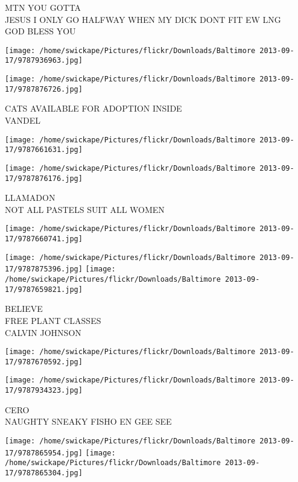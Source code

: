 \documentclass[10pt,letterpaper]{article}
\begin{document}
MTN YOU GOTTA\\
JESUS I ONLY GO HALFWAY WHEN MY DICK DONT FIT EW LNG\\
GOD BLESS YOU
\pagebreak

\texttt{[image: /home/swickape/Pictures/flickr/Downloads/Baltimore 2013-09-17/9787936963.jpg]}

\vspace{0.25in}
\texttt{[image: /home/swickape/Pictures/flickr/Downloads/Baltimore 2013-09-17/9787876726.jpg]}

CATS AVAILABLE FOR ADOPTION INSIDE\\
VANDEL
\pagebreak

\texttt{[image: /home/swickape/Pictures/flickr/Downloads/Baltimore 2013-09-17/9787661631.jpg]}

\vspace{0.25in}
\texttt{[image: /home/swickape/Pictures/flickr/Downloads/Baltimore 2013-09-17/9787876176.jpg]}

LLAMADON\\
NOT ALL PASTELS SUIT ALL WOMEN
\pagebreak

\texttt{[image: /home/swickape/Pictures/flickr/Downloads/Baltimore 2013-09-17/9787660741.jpg]}

\vspace{0.25in}
\texttt{[image: /home/swickape/Pictures/flickr/Downloads/Baltimore 2013-09-17/9787875396.jpg]}
\texttt{[image: /home/swickape/Pictures/flickr/Downloads/Baltimore 2013-09-17/9787659821.jpg]}

BELIEVE\\
FREE PLANT CLASSES\\
CALVIN JOHNSON
\pagebreak

\texttt{[image: /home/swickape/Pictures/flickr/Downloads/Baltimore 2013-09-17/9787670592.jpg]}

\vspace{0.25in}
\texttt{[image: /home/swickape/Pictures/flickr/Downloads/Baltimore 2013-09-17/9787934323.jpg]}

CERO\\
NAUGHTY SNEAKY FISHO EN GEE SEE
\pagebreak

\texttt{[image: /home/swickape/Pictures/flickr/Downloads/Baltimore 2013-09-17/9787865954.jpg]}
\texttt{[image: /home/swickape/Pictures/flickr/Downloads/Baltimore 2013-09-17/9787865304.jpg]}
\end{document}
